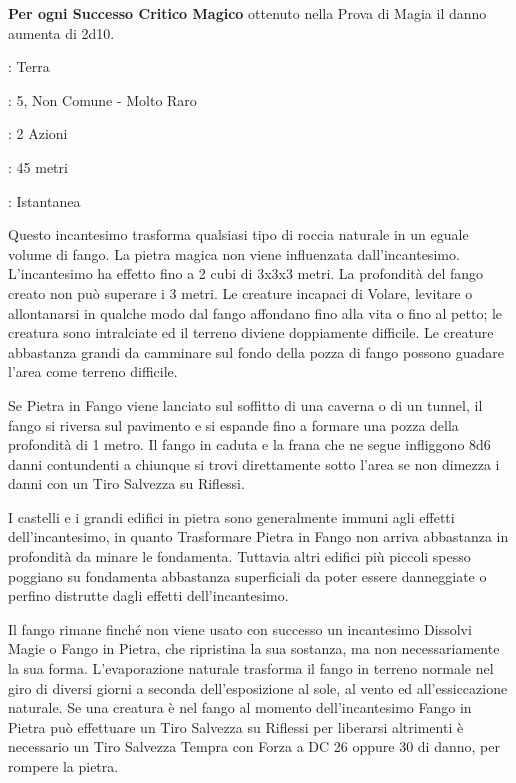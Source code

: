 \begin{multicols}{2}
\textbf{Per ogni Successo Critico Magico} ottenuto nella Prova di Magia il danno aumenta di 2d10.



\noindent
\begin{description}[noitemsep, topsep=0pt, parsep=0pt, partopsep=0pt, leftmargin=0cm, labelwidth=1.3cm]
	\item[\textbf{Lista}]: Terra
	\item[\textbf{Livello}]: 5, Non Comune - Molto Raro
	\item[\textbf{Lancio}]: 2 Azioni
	\item[\textbf{Gittata}]: 45 metri
	\item[\textbf{Durata}]: Istantanea
\end{description}

Questo incantesimo trasforma qualsiasi tipo di roccia naturale in un eguale volume di fango. La pietra magica non viene influenzata dall'incantesimo. L'incantesimo ha effetto fino a 2 cubi di 3x3x3 metri. La profondità del fango creato non può superare i 3 metri. Le creature incapaci di Volare, levitare o allontanarsi in qualche modo dal fango affondano fino alla vita o fino al petto; le creatura sono intralciate ed il terreno diviene doppiamente difficile. Le creature abbastanza grandi da camminare sul fondo della pozza di fango possono guadare l'area come terreno difficile.

Se Pietra in Fango viene lanciato sul soffitto di una caverna o di un tunnel, il fango si riversa sul pavimento e si espande fino a formare una pozza della profondità di 1 metro. Il fango in caduta e la frana che ne segue infliggono 8d6 danni contundenti a chiunque si trovi direttamente sotto l'area se non dimezza i danni con un Tiro Salvezza su Riflessi.

I castelli e i grandi edifici in pietra sono generalmente immuni agli effetti dell'incantesimo, in quanto Trasformare Pietra in Fango non arriva abbastanza in profondità da minare le fondamenta. Tuttavia altri edifici più piccoli spesso poggiano su fondamenta abbastanza superficiali da poter essere danneggiate o perfino distrutte dagli effetti dell'incantesimo.

Il fango rimane finché non viene usato con successo un incantesimo Dissolvi Magie o Fango in Pietra, che ripristina la sua sostanza, ma non necessariamente la sua forma. L'evaporazione naturale trasforma il fango in terreno normale nel giro di diversi giorni a seconda dell'esposizione al sole, al vento ed all'essiccazione naturale.
Se una creatura è nel fango al momento dell'incantesimo Fango in Pietra può effettuare un Tiro Salvezza su Riflessi per liberarsi altrimenti è necessario un Tiro Salvezza Tempra con Forza a DC 26 oppure 30 di danno, per rompere la pietra.


\end{multicols}
